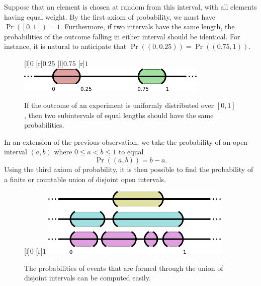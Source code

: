 Suppose that an element is chosen at random from this interval, with all elements having equal weight.
By the first axiom of probability, we must have $\Pr \left( [0,1] \right) = 1$.
Furthermore, if two intervals have the same length, the probabilities of the outcome falling in either interval should be identical.
For instance, it is natural to anticipate that $\Pr \left( \left( 0, 0.25 \right) \right) = \Pr \left( \left( 0.75, 1 \right) \right)$.

\begin{figure}[htb!]
\begin{center}
\begin{psfrags}
[l]{$0$}
[r]{$0.25$}
[l]{$0.75$}
[r]{$1$}
\includegraphics[height=1.185cm]{Figures/2Chapter/intervals}
\end{psfrags}
\caption{If the outcome of an experiment is uniformly distributed over $[0,1]$, then two subintervals of equal lengths should have the same probabilities.}
\end{center}
\end{figure}

In an extension of the previous observation, we take the probability of an open interval $(a, b)$ where $0 \leq a < b \leq 1$ to equal
\begin{equation} \label{equation:DefinitionProbabilityLaw1}
\Pr ( (a,b) ) = b - a .
\end{equation}
Using the third axiom of probability, it is then possible to find the probability of a finite or countable union of disjoint open intervals.

\begin{figure}[htb!]
\begin{center}
\begin{psfrags}
[l]{$0$}
[r]{$1$}
\includegraphics[height=3.28cm]{Figures/2Chapter/lineintervals}
\end{psfrags}
\caption{The probabilities of events that are formed through the union of disjoint intervals can be computed easily.}
\end{center}
\end{figure}

